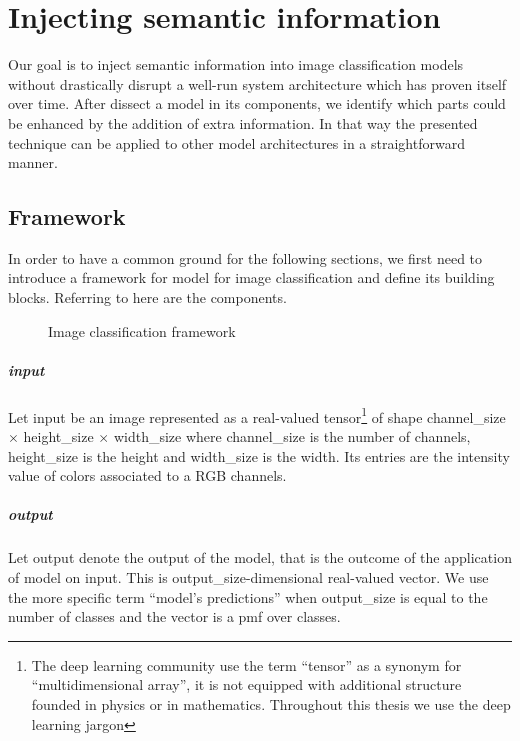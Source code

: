 \chapter{Injecting semantic information}
\label{ch:injecting-semantic-information}

Our goal is to inject semantic information into image classification models
without drastically disrupt a well-run system architecture which has proven
itself over time. After dissect a model in its components, we identify which
parts could be enhanced by the addition of extra information. In that way the
presented technique can be applied to other model architectures in a
straightforward manner.

\section{Framework}
\label{sec:framework}

In order to have a common ground for the following sections, we first need to
introduce a framework for model for image classification and define its building
blocks. Referring to  here are the components.

\begin{figure}[htbp]
  \caption{Image classification framework}
  \label{fig:03/framework}
\end{figure}

\paragraph{input} Let \gls{input} be an image represented as a real-valued
tensor\footnote{The deep learning community use the term ``tensor'' as a
synonym for ``multidimensional array'', it is not equipped with additional
structure founded in physics or in mathematics. Throughout this thesis we use
the deep learning jargon} of shape \gls{channel_size} $\times$ \gls{height_size}
$\times$ \gls{width_size} where \gls{channel_size} is the number of channels,
\gls{height_size} is the height and \gls{width_size} is the width. Its entries
are the intensity value of colors associated to a RGB channels.

\paragraph{output} Let \gls{output} denote the output of the model, that is the
outcome of the application of \gls{model} on \gls{input}. This is
\gls{output_size}-dimensional real-valued vector. We use the more specific term
``model's predictions'' when \gls{output_size} is equal to the number of
classes and the vector is a \acrlong{pmf} over classes.

